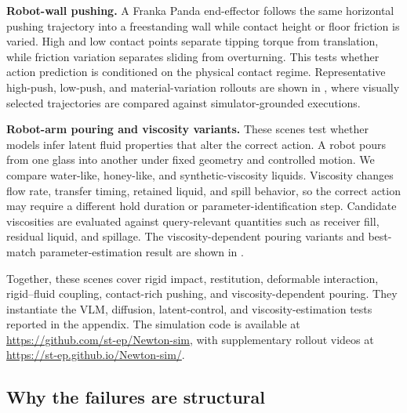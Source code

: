 \documentclass{article}
\begin{document}
\textbf{Robot-wall pushing.}
A Franka Panda end-effector follows the same horizontal pushing trajectory into a freestanding wall while contact height or floor friction is varied. High and low contact points separate tipping torque from translation, while friction variation separates sliding from overturning. This tests whether action prediction is conditioned on the physical contact regime. Representative high-push, low-push, and material-variation rollouts are shown in , where visually selected trajectories are compared against simulator-grounded executions.

\textbf{Robot-arm pouring and viscosity variants.}
These scenes test whether models infer latent fluid properties that alter the correct action. A robot pours from one glass into another under fixed geometry and controlled motion. We compare water-like, honey-like, and synthetic-viscosity liquids. Viscosity changes flow rate, transfer timing, retained liquid, and spill behavior, so the correct action may require a different hold duration or parameter-identification step. Candidate viscosities are evaluated against query-relevant quantities such as receiver fill, residual liquid, and spillage. The viscosity-dependent pouring variants and best-match parameter-estimation result are shown in .

Together, these scenes cover rigid impact, restitution, deformable interaction, rigid--fluid coupling, contact-rich pushing, and viscosity-dependent pouring. They instantiate the VLM, diffusion, latent-control, and viscosity-estimation tests reported in the appendix. The simulation code is available at \url{https://github.com/st-ep/Newton-sim}, with supplementary rollout videos at \url{https://st-ep.github.io/Newton-sim/}.

\subsection{Why the failures are structural}
\label{subsec:structural_failures}
\end{document}
